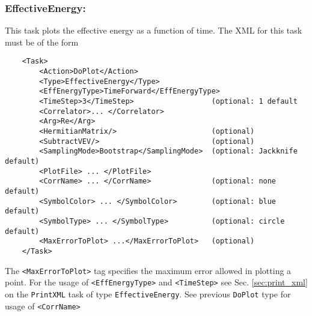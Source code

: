 \documentclass[12pt]{article}
\newcommand{\vb}{\texttt}
\begin{document}
\subsubsection{EffectiveEnergy:}
This task plots the effective energy as a function of time. The XML for this task must be of the form
\begin{verbatim}
    <Task>
        <Action>DoPlot</Action>
        <Type>EffectiveEnergy</Type>
        <EffEnergyType>TimeForward</EffEnergyType>
        <TimeStep>3</TimeStep>                  (optional: 1 default
        <Correlator>... </Correlator>
        <Arg>Re</Arg>
        <HermitianMatrix/>                      (optional)
        <SubtractVEV/>                          (optional)
        <SamplingMode>Bootstrap</SamplingMode>  (optional: Jackknife default)
        <PlotFile> ... </PlotFile>
        <CorrName> ... </CorrName>              (optional: none default)
        <SymbolColor> ... </SymbolColor>        (optional: blue default)
        <SymbolType> ... </SymbolType>          (optional: circle default)
        <MaxErrorToPlot> ...</MaxErrorToPlot>   (optional)
    </Task> 
\end{verbatim}
The \vb{<MaxErrorToPlot>} tag specifies the maximum error allowed in plotting a point.
For the usage of \vb{<EffEnergyType>} and \vb{<TimeStep>} see Sec. \ref{sec:print_xml}
on the \vb{PrintXML} task of type \vb{EffectiveEnergy}.
See previous \vb{DoPlot} type for usage of \vb{<CorrName>}
\end{document}
